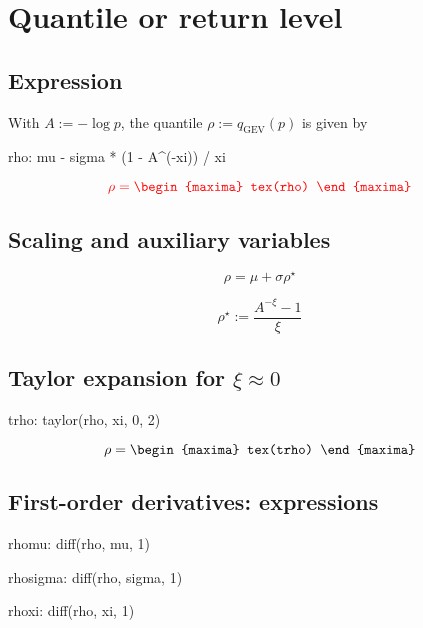 \section{Quantile or return level}

\subsection{Expression}


With $A:= -\log p$, the quantile $\rho := q_{\text{GEV}}(p)$ is given by
\begin{maxima}
  rho: mu - sigma * (1 -  A^(-xi)) / xi
\end{maxima}


\begin{equation}
  \label{eq:DefRho}
  \color{red}
  \rho= 
  \begin{maxima}
    tex(rho)
  \end{maxima}
\end{equation}

\subsection{Scaling and auxiliary variables}

$$
   \rho = \mu + \sigma \rho^\star
$$

\begin{equation}
  \rho^\star := \frac{ A^{-\xi} - 1}{\xi} 
\end{equation}

\subsection{Taylor expansion for $\xi \approx 0$}

\begin{maxima}
  trho: taylor(rho, xi, 0, 2)
\end{maxima}
{\color{MonVertF}
\begin{equation*}
  \rho = 
  \begin{maxima}
    tex(trho)
  \end{maxima}
\end{equation*}}

\subsection{First-order derivatives: expressions}
\begin{maxima}
   rhomu: diff(rho, mu, 1)
\end{maxima}
\begin{maxima}
  rhosigma: diff(rho, sigma, 1)
\end{maxima}
\begin{maxima}
  rhoxi: diff(rho, xi, 1)
\end{maxima}

